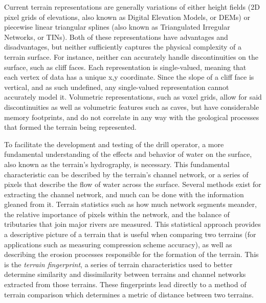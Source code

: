 Current terrain representations are generally variations of either height fields (2D pixel grids of elevations, also known as Digital Elevation Models, or DEMs) or piecewise linear triangular splines (also known as Triangulated Irregular Networks, or TINs). Both of these representations have advantages and disadvantages, but neither sufficiently captures the physical complexity of a terrain surface. For instance, neither can accurately handle discontinuities on the surface, such as cliff faces. 
Each representation is single-valued, meaning that each vertex of data has a unique x,y coordinate. Since the slope of a cliff face is vertical, and as such undefined, any single-valued representation cannot accurately model it.
% 
Volumetric representations, such as voxel grids, allow for said discontinuities as well as volumetric features such as caves, but have considerable memory footprints, and do not correlate in any way with the geological processes that formed the terrain being represented. 


To facilitate the development and testing of the drill operator, a more fundamental understanding of the 
% 
effects and behavior of water on the surface, also known as the terrain's hydrography, is necessary.
This fundamental characteristic can be described by the terrain's channel network, or a series of pixels that describe the flow of water across the surface.
% 
Several methods exist for extracting the channel network,
and much can be done with the information gleaned from it.  
Terrain statistics such as 
how much network segments meander, the relative importance of pixels within the network, and the balance of tributaries that join major rivers are measured.
This statistical approach provides a descriptive picture of a terrain that is useful when comparing two terrains (for applications such as measuring compression scheme accuracy), as well as describing the erosion processes responsible for the formation of the terrain.
This is the \emph{terrain fingerprint}, a series of terrain characteristics used to better determine similarity and dissimilarity between terrains and channel networks extracted from those terrains. These fingerprints lead directly to a method of terrain comparison which determines a metric of distance between two terrains.



